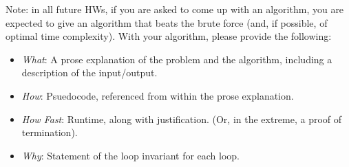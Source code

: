 \documentclass{article}
\begin{document}
Note: in all future HWs, if you are asked to come up with an algorithm, you are
expected to give an algorithm that beats the brute force (and, if possible, of
optimal time complexity). With your algorithm, please provide the following:
\begin{itemize}
    \item \emph{What}: A prose explanation of the problem and the algorithm,
        including a description of the input/output.
    \item \emph{How}: Psuedocode, referenced from within the prose explanation.
    \item \emph{How Fast}: Runtime, along with justification.  (Or, in the
        extreme, a proof of termination).
    \item \emph{Why}: Statement of the loop invariant for each loop.
\end{itemize}
\end{document}
